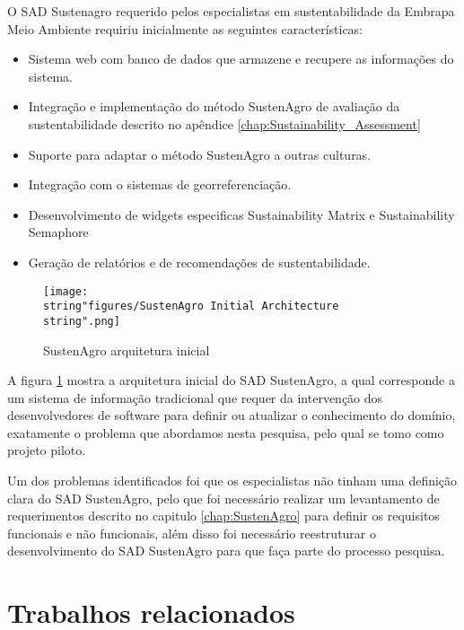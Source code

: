 O SAD Sustenagro requerido pelos especialistas em sustentabilidade
da Embrapa Meio Ambiente requiriu inicialmente as seguintes características:
\begin{itemize}
\item Sistema web com banco de dados que armazene e recupere as informações
do sistema.
\item Integração e implementação do método SustenAgro de avaliação da sustentabilidade
descrito no apêndice \ref{chap:Sustainability_Assessment} 
\item Suporte para adaptar o método SustenAgro a outras culturas.
\item Integração com o sistemas de georreferenciação.
\item Desenvolvimento de \foreignlanguage{english}{widgets} especificas
\foreignlanguage{english}{Sustainability Matrix }e \foreignlanguage{english}{Sustainability
Semaphore} 
\item Geração de relatórios e de recomendações de sustentabilidade.
\end{itemize}
\begin{figure}[h]
\begin{centering}
\texttt{[image: \\string"figures/SustenAgro Initial Architecture\\string".png]}
\par\end{centering}
\caption{SustenAgro arquitetura inicial\label{fig:SustenAgro-arquitetura-inicial}}
\end{figure}

A figura \ref{fig:SustenAgro-arquitetura-inicial} mostra a arquitetura
inicial do SAD SustenAgro, a qual corresponde a um sistema de informação
tradicional que requer da intervenção dos desenvolvedores de software
para definir ou atualizar o conhecimento do domínio, exatamente o
problema que abordamos nesta pesquisa, pelo qual se tomo como projeto
piloto.

Um dos problemas identificados foi que os especialistas não tinham
uma definição clara do SAD SustenAgro, pelo que foi necessário realizar
um levantamento de requerimentos descrito no capitulo \ref{chap:SustenAgro}
para definir os requisitos funcionais e não funcionais, além disso
foi necessário reestruturar o desenvolvimento do SAD SustenAgro para
que faça parte do processo pesquisa.

\section{Trabalhos relacionados}

